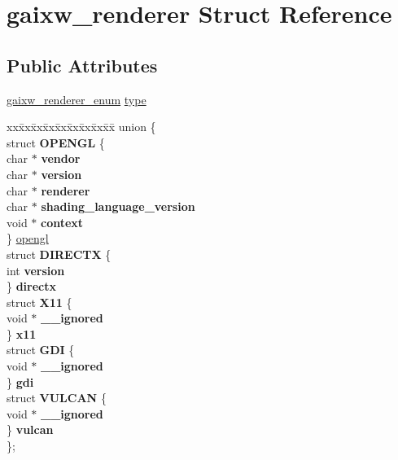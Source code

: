 \hypertarget{structgaixw__renderer}{}\section{gaixw\+\_\+renderer Struct Reference}
\label{structgaixw__renderer}
\subsection*{Public Attributes}
\begin{DoxyCompactItemize}
\item 
\hyperlink{gai__xwindow_8h_a4eae6e51f0425197a4c1010fcc7c8c9d}{gaixw\+\_\+renderer\+\_\+enum} \hyperlink{structgaixw__renderer_a287bd5241e45837849116cf46c5591ba}{type}
\item 
\mbox{\label{structgaixw__renderer_ace961bbef2def8468772db2dea275bdb}} 
\begin{tabbing}
xx\=xx\=xx\=xx\=xx\=xx\=xx\=xx\=xx\=\kill
union \{\\
\>struct {\bfseries OPENGL} \{\\
\>\>char $\ast$ {\bfseries vendor}\\
\>\>char $\ast$ {\bfseries version}\\
\>\>char $\ast$ {\bfseries renderer}\\
\>\>char $\ast$ {\bfseries shading\_language\_version}\\
\>\>void $\ast$ {\bfseries context}\\
\>\} \hyperlink{structgaixw__renderer_a166d9e23ab4edbbad58218bc6bf73cb6}{opengl}\\
\>struct {\bfseries DIRECTX} \{\\
\>\>int {\bfseries version}\\
\>\} {\bfseries directx}\\
\>struct {\bfseries X11} \{\\
\>\>void $\ast$ {\bfseries \_\_ignored}\\
\>\} {\bfseries x11}\\
\>struct {\bfseries GDI} \{\\
\>\>void $\ast$ {\bfseries \_\_ignored}\\
\>\} {\bfseries gdi}\\
\>struct {\bfseries VULCAN} \{\\
\>\>void $\ast$ {\bfseries \_\_ignored}\\
\>\} {\bfseries vulcan}\\
\}; \\

\end{tabbing}\end{DoxyCompactItemize}


